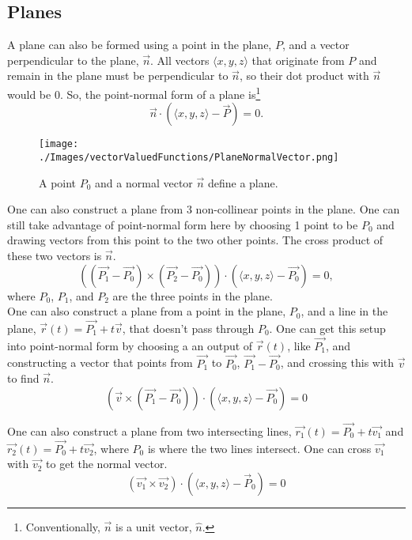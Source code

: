 \subsection{Planes}
\noindent
A plane can also be formed using a point in the plane, $P$, and a vector perpendicular to the plane, $\vec{n}$.
All vectors $\langle x,y,z \rangle$ that originate from $P$ and remain in the plane must be perpendicular to $\vec{n}$, so their dot product with $\vec{n}$ would be 0.
So, the point-normal form of a plane is\footnote{Conventionally, $\vec{n}$ is a unit vector, $\hat{n}$.}
\begin{equation*}
	\vec{n}\cdot\left(\langle x,y,z \rangle - \vec{P}\right) = 0.
\end{equation*}

\begin{figure}[H]
	\centering
	\texttt{[image: ./Images/vectorValuedFunctions/PlaneNormalVector.png]}
	\caption{A point $P_0$ and a normal vector $\vec{n}$ define a plane.}
\end{figure}

\noindent
One can also construct a plane from 3 non-collinear points in the plane.
One can still take advantage of point-normal form here by choosing 1 point to be $P_0$ and drawing vectors from this point to the two other points.
The cross product of these two vectors is $\vec{n}$.
\begin{equation*}
	\left(\left(\vec{P_1} - \vec{P_0}\right) \times \left(\vec{P_2} - \vec{P_0}\right)\right) \cdot \left(\langle x,y,z \rangle - \vec{P_0}\right) = 0,
\end{equation*}
where $P_0$, $P_1$, and $P_2$ are the three points in the plane.\\

\noindent
One can also construct a plane from a point in the plane, $P_0$, and a line in the plane, $\vec{r}(t) = \vec{P_1} + t\vec{v}$, that doesn't pass through $P_0$.
One can get this setup into point-normal form by choosing a an output of $\vec{r}(t)$, like $\vec{P_1}$, and constructing a vector that points from $\vec{P_1}$ to $\vec{P_0}$, $\vec{P_1}-\vec{P_0}$, and crossing this with $\vec{v}$ to find $\vec{n}$.
\begin{equation*}
	\left(\vec{v} \times \left(\vec{P_1} - \vec{P_0}\right)\right) \cdot \left(\langle x,y,z \rangle - \vec{P_0}\right) = 0
\end{equation*}

\noindent
One can also construct a plane from two intersecting lines, $\vec{r_1}(t) = \vec{P_0} + t\vec{v_1}$ and $\vec{r_2}(t) = \vec{P_0} + t\vec{v_2}$, where $P_0$ is where the two lines intersect.
One can cross $\vec{v_1}$ with $\vec{v_2}$ to get the normal vector.
\begin{equation*}
	\left(\vec{v_1} \times \vec{v_2}\right) \cdot \left(\langle x,y,z \rangle - \vec{P}_{0}\right) = 0
\end{equation*}